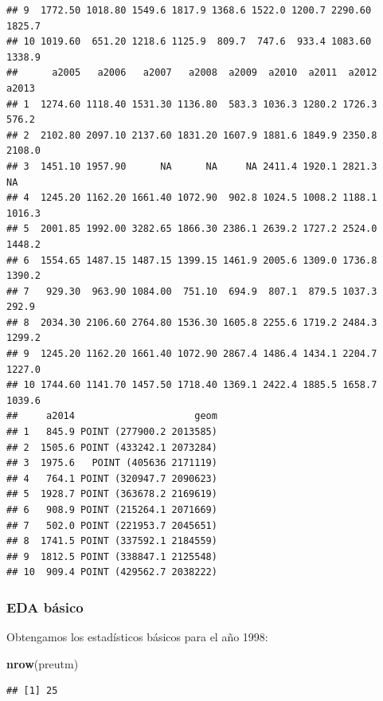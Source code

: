 \documentclass[11pt,]{article}
\newenvironment{Shaded}{\begin{snugshade}}{\end{snugshade}}
\newcommand{\KeywordTok}[1]{\textcolor[rgb]{0.13,0.29,0.53}{\textbf{#1}}}
\newcommand{\OperatorTok}[1]{\textcolor[rgb]{0.81,0.36,0.00}{\textbf{#1}}}
\newcommand{\NormalTok}[1]{#1}
\begin{document}
\begin{verbatim}
## 9  1772.50 1018.80 1549.6 1817.9 1368.6 1522.0 1200.7 2290.60 1825.7
## 10 1019.60  651.20 1218.6 1125.9  809.7  747.6  933.4 1083.60 1338.9
##      a2005   a2006   a2007   a2008  a2009  a2010  a2011  a2012  a2013
## 1  1274.60 1118.40 1531.30 1136.80  583.3 1036.3 1280.2 1726.3  576.2
## 2  2102.80 2097.10 2137.60 1831.20 1607.9 1881.6 1849.9 2350.8 2108.0
## 3  1451.10 1957.90      NA      NA     NA 2411.4 1920.1 2821.3     NA
## 4  1245.20 1162.20 1661.40 1072.90  902.8 1024.5 1008.2 1188.1 1016.3
## 5  2001.85 1992.00 3282.65 1866.30 2386.1 2639.2 1727.2 2524.0 1448.2
## 6  1554.65 1487.15 1487.15 1399.15 1461.9 2005.6 1309.0 1736.8 1390.2
## 7   929.30  963.90 1084.00  751.10  694.9  807.1  879.5 1037.3  292.9
## 8  2034.30 2106.60 2764.80 1536.30 1605.8 2255.6 1719.2 2484.3 1299.2
## 9  1245.20 1162.20 1661.40 1072.90 2867.4 1486.4 1434.1 2204.7 1227.0
## 10 1744.60 1141.70 1457.50 1718.40 1369.1 2422.4 1885.5 1658.7 1039.6
##     a2014                     geom
## 1   845.9 POINT (277900.2 2013585)
## 2  1505.6 POINT (433242.1 2073284)
## 3  1975.6   POINT (405636 2171119)
## 4   764.1 POINT (320947.7 2090623)
## 5  1928.7 POINT (363678.2 2169619)
## 6   908.9 POINT (215264.1 2071669)
## 7   502.0 POINT (221953.7 2045651)
## 8  1741.5 POINT (337592.1 2184559)
## 9  1812.5 POINT (338847.1 2125548)
## 10  909.4 POINT (429562.7 2038222)
\end{verbatim}

\subsubsection{EDA básico}\label{eda-buxe1sico}

Obtengamos los estadísticos básicos para el año 1998:

\begin{Shaded}
\begin{Highlighting}[]
\KeywordTok{nrow}\NormalTok{(preutm)}
\end{Highlighting}
\end{Shaded}

\begin{verbatim}
## [1] 25
\end{verbatim}

\begin{Shaded}
\end{Shaded}
\end{document}
